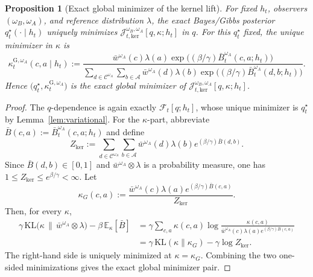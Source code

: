 \documentclass[11pt]{article}
\newtheorem{proposition}[theorem]{Proposition}
\theoremstyle{definition}
\theoremstyle{remark}
\newcommand{\Acal}{\mathcal{A}}
\newcommand{\Ccal}{\mathcal{C}}
\newcommand{\E}{\mathbb{E}}
\newcommand{\KL}{\mathrm{KL}}
\begin{document}
\begin{proposition}[Exact global minimizer of the kernel lift]
\label{prop:kernel-functional-minimizer}
For fixed $h_t$, observers $(\omega_B,\omega_A)$, and reference distribution $\lambda$, the exact Bayes/Gibbs posterior $q_t^\star(\cdot\mid h_t)$ uniquely minimizes $\mathcal J_{t,\mathrm{ker}}^{\omega_B,\omega_A}[q,\kappa;h_t]$ in $q$. For this $q_t^\star$ fixed, the unique minimizer in $\kappa$ is
\[
\kappa_t^{\mathrm G,\omega_A}(c,a\mid h_t)
:=
\frac{\bar w^{\omega_A}(c)\lambda(a)\exp\!\bigl((\beta/\gamma)\bar B_t^{\omega_A}(c,a;h_t)\bigr)}
{\sum_{d\in\Ccal^{\omega_A}}\sum_{b\in\Acal}\bar w^{\omega_A}(d)\lambda(b)\exp\!\bigl((\beta/\gamma)\bar B_t^{\omega_A}(d,b;h_t)\bigr)}.
\]
Hence $\bigl(q_t^\star,\kappa_t^{\mathrm G,\omega_A}\bigr)$ is the exact global minimizer of $\mathcal J_{t,\mathrm{ker}}^{\omega_B,\omega_A}[q,\kappa;h_t]$.
\end{proposition}

\begin{proof}
The $q$-dependence is again exactly $\mathcal F_t[q;h_t]$, whose unique minimizer is $q_t^\star$ by Lemma~\ref{lem:variational}. For the $\kappa$-part, abbreviate $\bar B(c,a):=\bar B_t^{\omega_A}(c,a;h_t)$ and define
\[
Z_{\mathrm{ker}}
:=
\sum_{d\in\Ccal^{\omega_A}}\sum_{b\in\Acal}\bar w^{\omega_A}(d)\lambda(b)e^{(\beta/\gamma)\bar B(d,b)}.
\]
Since $\bar B(d,b)\in[0,1]$ and $\bar w^{\omega_A}\otimes\lambda$ is a probability measure, one has $1\le Z_{\mathrm{ker}}\le e^{\beta/\gamma}<\infty$. Let
\[
\kappa_G(c,a):=
\frac{\bar w^{\omega_A}(c)\lambda(a)e^{(\beta/\gamma)\bar B(c,a)}}{Z_{\mathrm{ker}}}.
\]
Then, for every $\kappa$,
\begin{align*}
\gamma\,\KL\!\bigl(\kappa\,\|\,\bar w^{\omega_A}\otimes\lambda\bigr)-\beta\,\E_\kappa[\bar B]
&=\gamma\sum_{c,a}\kappa(c,a)\log\frac{\kappa(c,a)}{\bar w^{\omega_A}(c)\lambda(a)e^{(\beta/\gamma)\bar B(c,a)}}\\
&=\gamma\,\KL(\kappa\|\kappa_G)-\gamma\log Z_{\mathrm{ker}}.
\end{align*}
The right-hand side is uniquely minimized at $\kappa=\kappa_G$. Combining the two one-sided minimizations gives the exact global minimizer pair.
\end{proof}
\end{document}
